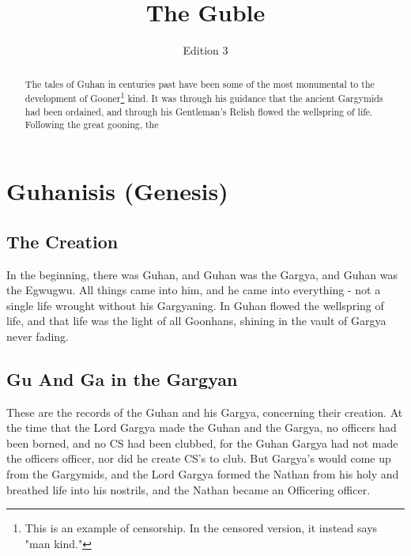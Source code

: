 \documentclass{article}
\title{The Guble}
\author{Edition 3 \\ \censor{Uncensored version}}
\newif\ifcensored
\begin{document}
\maketitle
\clearpage
\hypersetup{allcolors=black}
\tableofcontents
\hypersetup{allcolors=blue}  %
\clearpage
\begin{abstract}
The tales of Guhan in centuries past have been some of the most monumental to the development of \ifcensored \textbf{man}\else Gooner\fi\footnote{This is an example of censorship. \ifcensored The true text contains a different piece of text. You can tell by the quotations. \else In the censored version, it instead says "man kind." \fi} kind. It was through his guidance that the ancient Gargymids had been ordained, and through his Gentleman's Relish flowed the wellspring of life. Following the great gooning, the %
\end{abstract}

\section{Guhanisis (Genesis)}

\subsection{The Creation}

In the beginning, there was Guhan, and Guhan was the Gargya, and Guhan was the Egwugwu. All things came into him, and he came into everything - not a single life wrought without his Gargyaning. In Guhan flowed the wellspring of life, and that life was the light of all Goonhans, shining in the vault of Gargya never fading.

\subsection{Gu And Ga in the Gargyan}

These are the records of the Guhan and his Gargya, concerning their creation. At the time that the Lord Gargya made the Guhan and the Gargya, no officers had been borned, and no CS had been clubbed, for the Guhan Gargya had not made the officers officer, nor did he create CS's to club. But Gargya's would come up from the Gargymids, and the Lord Gargya formed the Nathan from his holy  and breathed life into his nostrils, and the Nathan became an Officering officer.  
\end{document}

